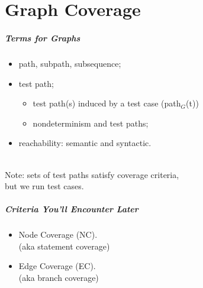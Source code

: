 \documentclass{beamer}
\newenvironment{changemargin}[1]{%
  \begin{list}{}{%
    \setlength{\topsep}{0pt}%
    \setlength{\leftmargin}{#1}%
    \setlength{\rightmargin}{1em}
    \setlength{\listparindent}{\parindent}%
    \setlength{\itemindent}{\parindent}%
    \setlength{\parsep}{\parskip}%
  }%
  \item[]}{\end{list}}
\begin{document}
\part{Graph Coverage}
\begin{frame}
\partpage
\end{frame}

\begin{frame}
  \frametitle{Terms for Graphs}

  \begin{changemargin}{2cm}
    \begin{itemize}
    \item path, subpath, subsequence;
    \item test path;
      \begin{itemize}
    \item test path(s) induced by a test case (path$_G$(t))
    \item nondeterminism and test paths;
      \end{itemize}
    \item reachability: semantic and syntactic.
    \end{itemize}
    ~\\[1em]
    Note: sets of test paths satisfy coverage criteria,\\ \hspace*{2cm} but we run test cases.
  \end{changemargin}
\end{frame}

\begin{frame}
  \frametitle{Criteria You'll Encounter Later}

  \Large
  \begin{changemargin}{2cm}
    \begin{itemize}
    \item Node Coverage (NC). \\ \hspace*{2em} (aka statement coverage)
    \item Edge Coverage (EC). \\ \hspace*{2em} (aka branch coverage)
    \end{itemize}
  \end{changemargin}
\end{frame}
\end{document}
